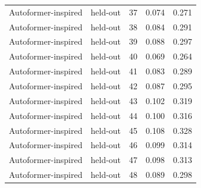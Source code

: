 \begin{tabular}{llrrr}
Autoformer-inspired & held-out & 37 & 0.074 & 0.271 \\
Autoformer-inspired & held-out & 38 & 0.084 & 0.291 \\
Autoformer-inspired & held-out & 39 & 0.088 & 0.297 \\
Autoformer-inspired & held-out & 40 & 0.069 & 0.264 \\
Autoformer-inspired & held-out & 41 & 0.083 & 0.289 \\
Autoformer-inspired & held-out & 42 & 0.087 & 0.295 \\
Autoformer-inspired & held-out & 43 & 0.102 & 0.319 \\
Autoformer-inspired & held-out & 44 & 0.100 & 0.316 \\
Autoformer-inspired & held-out & 45 & 0.108 & 0.328 \\
Autoformer-inspired & held-out & 46 & 0.099 & 0.314 \\
Autoformer-inspired & held-out & 47 & 0.098 & 0.313 \\
Autoformer-inspired & held-out & 48 & 0.089 & 0.298 \\
\bottomrule
\end{tabular}
